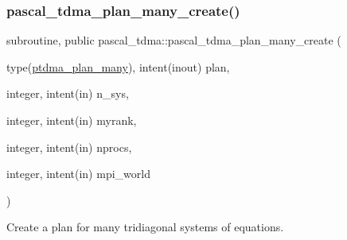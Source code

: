 \subsubsection{\texorpdfstring{pascal\+\_\+tdma\+\_\+plan\+\_\+many\+\_\+create()}{pascal\_tdma\_plan\_many\_create()}}
{\footnotesize\ttfamily subroutine, public pascal\+\_\+tdma\+::pascal\+\_\+tdma\+\_\+plan\+\_\+many\+\_\+create (\begin{DoxyParamCaption}\item[{type(\hyperlink{structpascal__tdma_1_1ptdma__plan__many}{ptdma\+\_\+plan\+\_\+many}), intent(inout)}]{plan,  }\item[{integer, intent(in)}]{n\+\_\+sys,  }\item[{integer, intent(in)}]{myrank,  }\item[{integer, intent(in)}]{nprocs,  }\item[{integer, intent(in)}]{mpi\+\_\+world }\end{DoxyParamCaption})}



Create a plan for many tridiagonal systems of equations. 


